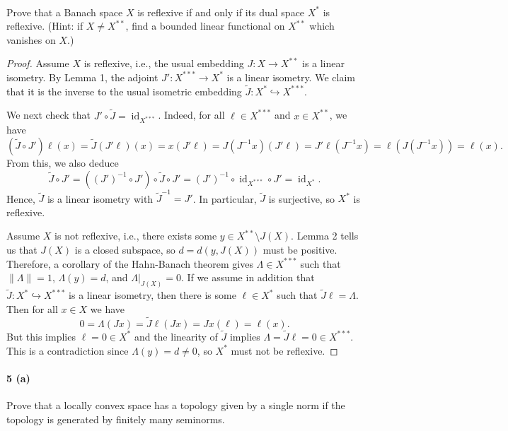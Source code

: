 \documentclass[12pt]{article}
\newlength{\myparskip}
\newenvironment{fullbox}{\begin{lrbox}{\savefullbox}\begin{minipage}{\dimexpr\textwidth-2\fboxsep\relax}\setlength{\parskip}{\myparskip}}{\end{minipage}\end{lrbox}\framebox[\textwidth]{\usebox{\savefullbox}}}
\newenvironment{pbox}[1][]{\begin{fullbox}\def\temp{#1}\ifx\temp\empty\else\paragraph{#1}\phantom{}\fi}{\end{fullbox}}
\theoremstyle{definition}
\newcommand{\<}{\langle}
\renewcommand{\>}{\rangle}
\DeclareMathOperator{\id}{id}
\newcommand{\inc}{\hookrightarrow}
\begin{document}
\begin{pbox}
    Prove that a Banach space $X$ is reflexive if and only if its dual space $X^*$ is reflexive.
    (Hint: if $X \ne X^{**}$, find a bounded linear functional on $X^{**}$ which vanishes on $X$.)
\end{pbox}

\begin{proof}
    Assume $X$ is reflexive, i.e., the usual embedding $J : X \to X^{**}$ is a linear isometry.
    By Lemma 1, the adjoint $J' : X^{***} \to X^*$ is a linear isometry.
    We claim that it is the inverse to the usual isometric embedding $\tilde{J} : X^* \inc X^{***}$.
    
    We next check that $J' \circ \tilde{J} = \id_{X^{***}}$.
    Indeed, for all $\ell \in X^{***}$ and $x \in X^{**}$, we have
    \[
        (\tilde{J} \circ J')\ell(x)
            = \tilde{J}(J'\ell)(x) 
            = x(J'\ell) 
            = J(J^{-1}x)(J'\ell) 
            = J'\ell(J^{-1}x) 
            = \ell(J(J^{-1}x)) 
            = \ell(x).
    \]
    From this, we also deduce
    \[
        \tilde{J} \circ J'
            = \left((J')^{-1} \circ J'\right) \circ \tilde{J} \circ J'
            = (J')^{-1} \circ \id_{X^{***}} \circ J'
            = \id_{X^*}.
    \]
    Hence, $\tilde{J}$ is a linear isometry with $\tilde{J}^{-1} = J'$.
    In particular, $\tilde{J}$ is surjective, so $X^*$ is reflexive.

    Assume $X$ is not reflexive, i.e., there exists some $y \in X^{**} \setminus J(X)$.
    Lemma 2 tells us that $J(X)$ is a closed subspace, so $d = d(y, J(X))$ must be positive.
    Therefore, a corollary of the Hahn-Banach theorem gives $\Lambda \in X^{***}$ such that $\|\Lambda\| = 1$, $\Lambda(y) = d$, and $\Lambda|_{J(X)} = 0$.
    If we assume in addition that $\tilde{J} : X^* \inc X^{***}$ is a linear isometry, then there is some $\ell \in X^*$ such that $\tilde{J}\ell = \Lambda$.
    Then for all $x \in X$ we have
    \[
        0
            = \Lambda(Jx)
            = \tilde{J}\ell(Jx)
            = Jx(\ell)
            = \ell(x).
    \]
    But this implies $\ell = 0 \in X^*$ and the linearity of $\tilde{J}$ implies $\Lambda = \tilde{J}\ell = 0 \in X^{***}$.
    This is a contradiction since $\Lambda(y) = d \ne 0$, so $X^*$ must not be reflexive.
\end{proof}


\newpage
\begin{pbox}[5 (a)]
    Prove that a locally convex space has a topology given by a single norm if the topology is generated by finitely many seminorms.
\end{pbox}
\end{document}
